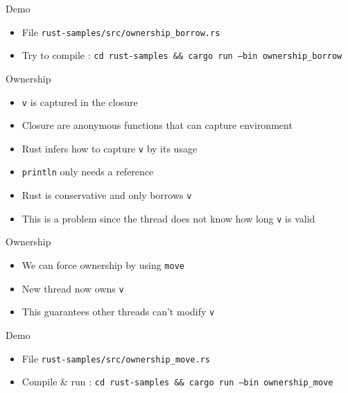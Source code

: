 \documentclass{beamer}
\begin{document}
\begin{frame}{Demo}
    \begin{itemize}
        \item File \texttt{rust-samples/src/ownership\_borrow.rs}
        \item Try to compile : \texttt{cd rust-samples \&\& cargo run --bin ownership\_borrow}
    \end{itemize}
\end{frame}

\begin{frame}{Ownership}
    \begin{itemize}
        \item \texttt{v} is captured in the closure
        \item Closure are anonymous functions that can capture environment
        \item Rust infers how to capture \texttt{v} by its usage
        \item \texttt{println} only needs a reference
        \item Rust is conservative and only borrows \texttt{v}
        \item This is a problem since the thread does not know how long
        \texttt{v} is valid
    \end{itemize}
\end{frame}

\begin{frame}{Ownership}
    \begin{itemize}
        \item We can force ownership by using \texttt{move}
        \item New thread now owns \texttt{v}
        \item This guarantees other threads can't modify \texttt{v}
    \end{itemize}
\end{frame}

\begin{frame}{Demo}
    \begin{itemize}
        \item File \texttt{rust-samples/src/ownership\_move.rs}
        \item Compile \& run : \texttt{cd rust-samples \&\& cargo run --bin ownership\_move}
    \end{itemize}
\end{frame}
\end{document}
